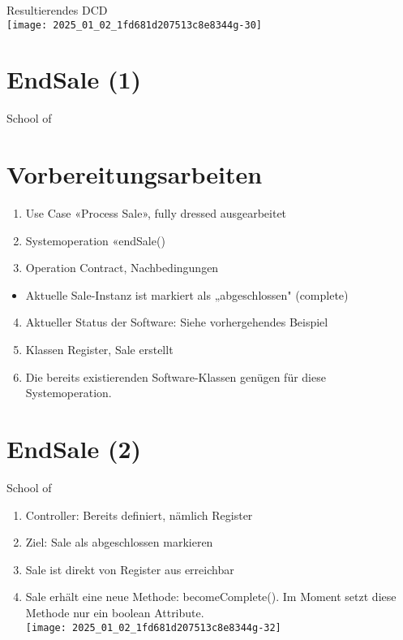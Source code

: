 \documentclass[10pt]{article}
\begin{document}
Resultierendes DCD\\
\texttt{[image: 2025\_01\_02\_1fd681d207513c8e8344g-30]}

\section*{EndSale (1)}
School of

\section*{Vorbereitungsarbeiten}
\begin{enumerate}
  \item Use Case «Process Sale», fully dressed ausgearbeitet
  \item Systemoperation «endSale()
  \item Operation Contract, Nachbedingungen
\end{enumerate}

\begin{itemize}
  \item Aktuelle Sale-Instanz ist markiert als „abgeschlossen" (complete)
\end{itemize}

\begin{enumerate}
  \setcounter{enumi}{3}
  \item Aktueller Status der Software: Siehe vorhergehendes Beispiel
  \item Klassen Register, Sale erstellt
  \item Die bereits existierenden Software-Klassen genügen für diese Systemoperation.
\end{enumerate}

\section*{EndSale (2)}
School of

\begin{enumerate}
  \item Controller: Bereits definiert, nämlich Register
  \item Ziel: Sale als abgeschlossen markieren
  \item Sale ist direkt von Register aus erreichbar
  \item Sale erhält eine neue Methode: becomeComplete(). Im Moment setzt diese Methode nur ein boolean Attribute.\\
\texttt{[image: 2025\_01\_02\_1fd681d207513c8e8344g-32]}
\end{enumerate}
\end{document}
